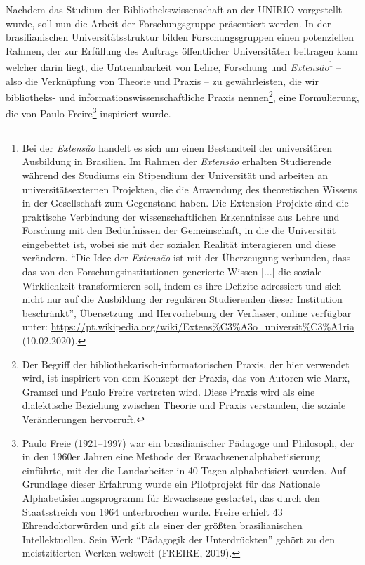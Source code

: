 \documentclass[a4paper,
fontsize=11pt,
oneside,
numbers=noperiodatend,
parskip=half-,
bibliography=totoc,
final
]{scrartcl}
\begin{document}
Nachdem das Studium der Bibliothekswissenschaft an der UNIRIO
vorgestellt wurde, soll nun die Arbeit der Forschungsgruppe präsentiert
werden. In der brasilianischen Universitätsstruktur bilden
Forschungsgruppen einen potenziellen Rahmen, der zur Erfüllung des
Auftrags öffentlicher Universitäten beitragen kann welcher darin liegt,
die Untrennbarkeit von Lehre, Forschung und \emph{Extensão}\footnote{Bei
  der \emph{Extensão} handelt es sich um einen Bestandteil der
  universitären Ausbildung in Brasilien. Im Rahmen der \emph{Extensão}
  erhalten Studierende während des Studiums ein Stipendium der
  Universität und arbeiten an universitätsexternen Projekten, die die
  Anwendung des theoretischen Wissens in der Gesellschaft zum Gegenstand
  haben. Die Extension-Projekte sind die praktische Verbindung der
  wissenschaftlichen Erkenntnisse aus Lehre und Forschung mit den
  Bedürfnissen der Gemeinschaft, in die die Universität eingebettet ist,
  wobei sie mit der sozialen Realität interagieren und diese verändern.
  \enquote{Die Idee der \emph{Extensão} ist mit der Überzeugung
  verbunden, dass das von den Forschungsinstitutionen generierte Wissen
  {[}...{]} die soziale Wirklichkeit transformieren soll, indem es ihre
  Defizite adressiert und sich nicht nur auf die Ausbildung der
  regulären Studierenden dieser Institution beschränkt}, Übersetzung und
  Hervorhebung der Verfasser, online verfügbar unter:
  \url{https://pt.wikipedia.org/wiki/Extens\%C3\%A3o_universit\%C3\%A1ria}
  (10.02.2020).} -- also die Verknüpfung von Theorie und Praxis -- zu
gewährleisten, die wir bibliotheks- und informationswissenschaftliche
Praxis nennen\footnote{Der Begriff der bibliothekarisch-informatorischen
  Praxis, der hier verwendet wird, ist inspiriert von dem Konzept der
  Praxis, das von Autoren wie Marx, Gramsci und Paulo Freire vertreten
  wird. Diese Praxis wird als eine dialektische Beziehung zwischen
  Theorie und Praxis verstanden, die soziale Veränderungen hervorruft.},
eine Formulierung, die von Paulo Freire\footnote{Paulo Freie
  (1921--1997) war ein brasilianischer Pädagoge und Philosoph, der in
  den 1960er Jahren eine Methode der Erwachsenenalphabetisierung
  einführte, mit der die Landarbeiter in 40 Tagen alphabetisiert wurden.
  Auf Grundlage dieser Erfahrung wurde ein Pilotprojekt für das
  Nationale Alphabetisierungsprogramm für Erwachsene gestartet, das
  durch den Staatsstreich von 1964 unterbrochen wurde. Freire erhielt 43
  Ehrendoktorwürden und gilt als einer der größten brasilianischen
  Intellektuellen. Sein Werk \enquote{Pädagogik der Unterdrückten}
  gehört zu den meistzitierten Werken weltweit (FREIRE, 2019).}
inspiriert wurde.
\end{document}
